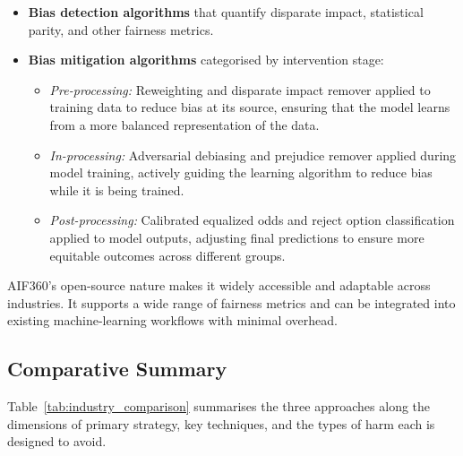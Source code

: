\begin{itemize}[leftmargin=2em]
    \item \textbf{Bias detection algorithms} that quantify disparate impact,
          statistical parity, and other fairness metrics.
    \item \textbf{Bias mitigation algorithms} categorised by intervention stage:
    \begin{itemize}[leftmargin=1.5em]
        \item \textit{Pre-processing:} Reweighting and disparate impact remover
              applied to training data to reduce bias at its source, ensuring
              that the model learns from a more balanced representation of the
              data.
        \item \textit{In-processing:} Adversarial debiasing and prejudice
              remover applied during model training, actively guiding the
              learning algorithm to reduce bias while it is being trained.
        \item \textit{Post-processing:} Calibrated equalized odds and reject
              option classification applied to model outputs, adjusting final
              predictions to ensure more equitable outcomes across different
              groups.
    \end{itemize}
\end{itemize}

AIF360's open-source nature makes it widely accessible and adaptable across
industries.
It supports a wide range of fairness metrics and can be integrated into
existing machine-learning workflows with minimal overhead.

\subsection{Comparative Summary}

Table~\ref{tab:industry_comparison} summarises the three approaches along the
dimensions of primary strategy, key techniques, and the types of harm each is
designed to avoid.

